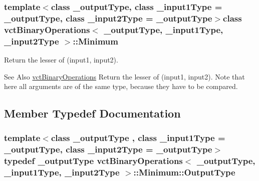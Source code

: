 \subsubsection*{template$<$class \-\_\-output\-Type, class \-\_\-input1\-Type = \-\_\-output\-Type, class \-\_\-input2\-Type = \-\_\-output\-Type$>$class vct\-Binary\-Operations$<$ \-\_\-output\-Type, \-\_\-input1\-Type, \-\_\-input2\-Type $>$\-::\-Minimum}

Return the lesser of (input1, input2). 

\begin{DoxySeeAlso}{See Also}
\hyperlink{classvct_binary_operations}{vct\-Binary\-Operations} Return the lesser of (input1, input2). Note that here all arguments are of the same type, because they have to be compared. 
\end{DoxySeeAlso}


\subsection{Member Typedef Documentation}
\hypertarget{classvct_binary_operations_1_1_minimum_a3a43e1925b5600853520784d42b58299}{
\subsubsection[{Output\-Type}]{\setlength{\rightskip}{0pt plus 5cm}template$<$class \-\_\-output\-Type , class \-\_\-input1\-Type  = \-\_\-output\-Type, class \-\_\-input2\-Type  = \-\_\-output\-Type$>$ typedef \-\_\-output\-Type {\bf vct\-Binary\-Operations}$<$ \-\_\-output\-Type, \-\_\-input1\-Type, \-\_\-input2\-Type $>$\-::{\bf Minimum\-::\-Output\-Type}}}\label{classvct_binary_operations_1_1_minimum_a3a43e1925b5600853520784d42b58299}


